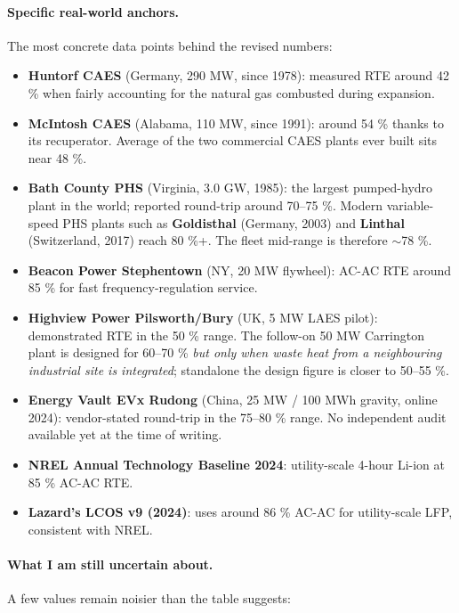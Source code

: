\paragraph{Specific real-world anchors.}
The most concrete data points behind the revised numbers:

\begin{itemize}
    \item \textbf{Huntorf CAES} (Germany, 290 MW, since 1978):
    measured RTE around 42 \% when fairly accounting for the natural
    gas combusted during expansion.
    \item \textbf{McIntosh CAES} (Alabama, 110 MW, since 1991):
    around 54 \% thanks to its recuperator. Average of the two
    commercial CAES plants ever built sits near 48 \%.
    \item \textbf{Bath County PHS} (Virginia, 3.0 GW, 1985): the
    largest pumped-hydro plant in the world; reported round-trip
    around 70--75 \%. Modern variable-speed PHS plants such as
    \textbf{Goldisthal} (Germany, 2003) and \textbf{Linthal}
    (Switzerland, 2017) reach 80 \%+. The fleet mid-range is therefore
    $\sim$78 \%.
    \item \textbf{Beacon Power Stephentown} (NY, 20 MW flywheel):
    AC-AC RTE around 85 \% for fast frequency-regulation service.
    \item \textbf{Highview Power Pilsworth/Bury} (UK, 5 MW LAES
    pilot): demonstrated RTE in the 50 \% range. The follow-on
    50 MW Carrington plant is designed for 60--70 \% \emph{but only
    when waste heat from a neighbouring industrial site is
    integrated}; standalone the design figure is closer to 50--55 \%.
    \item \textbf{Energy Vault EVx Rudong} (China, 25 MW / 100 MWh
    gravity, online 2024): vendor-stated round-trip in the 75--80 \%
    range. No independent audit available yet at the time of writing.
    \item \textbf{NREL Annual Technology Baseline 2024}: utility-scale
    4-hour Li-ion at 85 \% AC-AC RTE.
    \item \textbf{Lazard's LCOS v9 (2024)}: uses around 86 \% AC-AC
    for utility-scale LFP, consistent with NREL.
\end{itemize}

\paragraph{What I am still uncertain about.}
A few values remain noisier than the table suggests:


